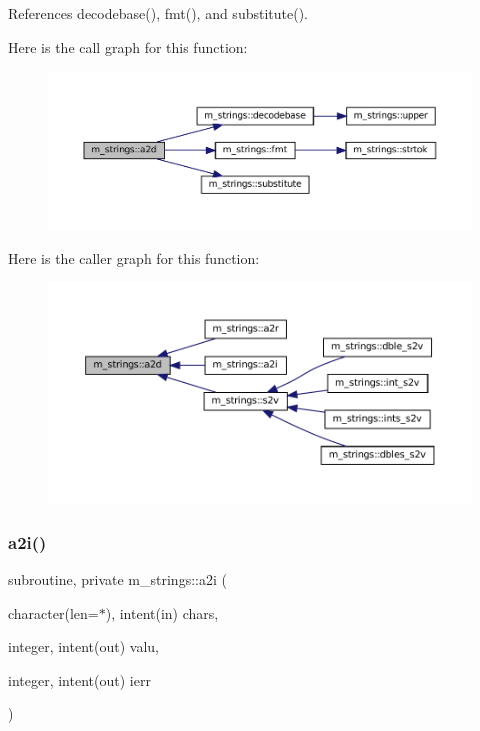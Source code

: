 References decodebase(), fmt(), and substitute().

Here is the call graph for this function\+:\nopagebreak
\begin{figure}[H]
\begin{center}
\leavevmode
\includegraphics[width=350pt]{namespacem__strings_a8a18024e04cc697243355de3d61e171c_cgraph}
\end{center}
\end{figure}
Here is the caller graph for this function\+:\nopagebreak
\begin{figure}[H]
\begin{center}
\leavevmode
\includegraphics[width=350pt]{namespacem__strings_a8a18024e04cc697243355de3d61e171c_icgraph}
\end{center}
\end{figure}
\mbox{\label{namespacem__strings_aca902af295ede82fb0c45174bbfe6eef}} 
\subsubsection{\texorpdfstring{a2i()}{a2i()}}
{\footnotesize\ttfamily subroutine, private m\+\_\+strings\+::a2i (\begin{DoxyParamCaption}\item[{character(len=$\ast$), intent(in)}]{chars,  }\item[{integer, intent(out)}]{valu,  }\item[{integer, intent(out)}]{ierr }\end{DoxyParamCaption})\hspace{0.3cm}{\ttfamily [private]}}



